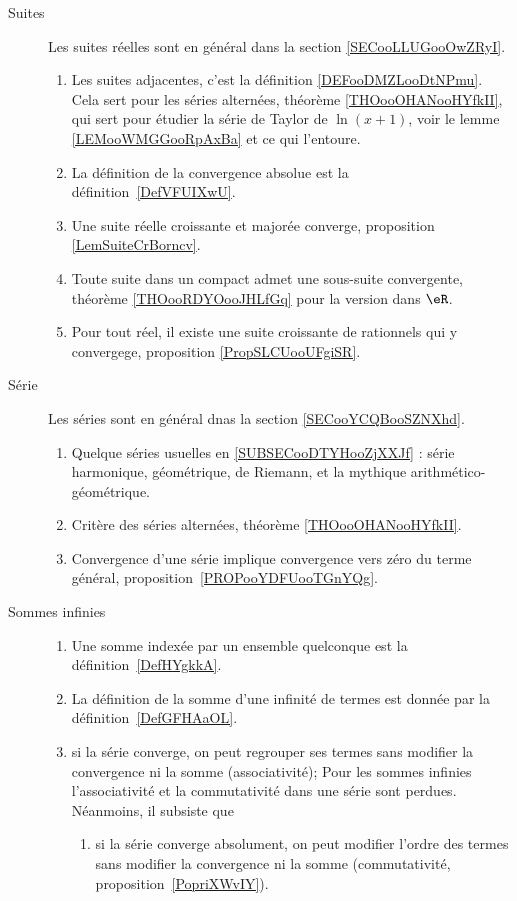 
\begin{description}
    \item[Suites] 
        Les suites réelles sont en général dans la section \ref{SECooLLUGooOwZRyI}.
        \begin{enumerate}
    \item
        Les suites adjacentes, c'est la définition \ref{DEFooDMZLooDtNPmu}. Cela sert pour les séries alternées, théorème \ref{THOooOHANooHYfkII}, qui sert pour étudier la série de Taylor de \( \ln(x+1)\), voir le lemme \ref{LEMooWMGGooRpAxBa} et ce qui l'entoure.
    \item
        La définition de la convergence absolue est la définition~\ref{DefVFUIXwU}.
            \item
                Une suite réelle croissante et majorée converge, proposition \ref{LemSuiteCrBorncv}.
            \item
                Toute suite dans un compact admet une sous-suite convergente, théorème \ref{THOooRDYOooJHLfGq} pour la version dans \( \eR\).
            \item
                Pour tout réel, il existe une suite croissante de rationnels qui y convergege, proposition \ref{PropSLCUooUFgiSR}.
        \end{enumerate}
    \item[Série] 
        Les séries sont en général dnas la section \ref{SECooYCQBooSZNXhd}.
        \begin{enumerate}
    \item
        Quelque séries usuelles en \ref{SUBSECooDTYHooZjXXJf} : série harmonique, géométrique, de Riemann, et la mythique arithmético-géométrique.
    \item
        Critère des séries alternées, théorème \ref{THOooOHANooHYfkII}.
    \item
        Convergence d'une série implique convergence vers zéro du terme général, proposition~\ref{PROPooYDFUooTGnYQg}.
        \end{enumerate}
    \item[Sommes infinies]
        \begin{enumerate}
            \item
Une somme indexée par un ensemble quelconque est la définition~\ref{DefHYgkkA}.
    \item
        La définition de la somme d'une infinité de termes est donnée par la définition~\ref{DefGFHAaOL}.
  \item
      si la série converge, on peut regrouper ses termes sans modifier la convergence ni la somme (associativité);
    Pour les sommes infinies l'associativité et la commutativité dans une série sont perdues. Néanmoins, il subsiste que
  \begin{enumerate}
  \item
      si la série converge absolument, on peut modifier l'ordre des termes sans modifier la convergence ni la somme (commutativité, proposition~\ref{PopriXWvIY}).
  \end{enumerate}
        \end{enumerate}
\end{description}
